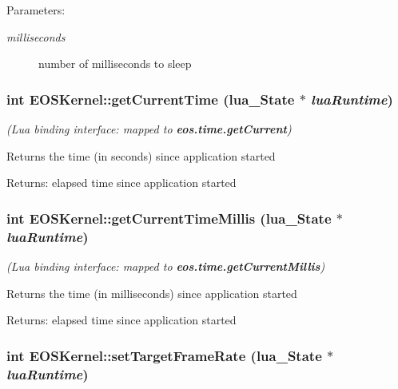 \begin{Desc}
\item[Parameters:]
\begin{description}
\item[{\em milliseconds}]number of milliseconds to sleep \end{description}
\end{Desc}
\hypertarget{structEOSKernel_8b244f5fbf545937dccaa2cb01720f33}{
\subsubsection[{getCurrentTime}]{\setlength{\rightskip}{0pt plus 5cm}int EOSKernel::getCurrentTime (lua\_\-State $\ast$ {\em luaRuntime})}}
\label{structEOSKernel_8b244f5fbf545937dccaa2cb01720f33}


{\em (Lua binding interface: mapped to {\bf eos.time.getCurrent})\/}\par
\par
 Returns the time (in seconds) since application started 

\begin{Desc}
\item[Returns:]elapsed time since application started \end{Desc}
\hypertarget{structEOSKernel_3b68f7decae2685ffa3137f290656a1e}{
\subsubsection[{getCurrentTimeMillis}]{\setlength{\rightskip}{0pt plus 5cm}int EOSKernel::getCurrentTimeMillis (lua\_\-State $\ast$ {\em luaRuntime})}}
\label{structEOSKernel_3b68f7decae2685ffa3137f290656a1e}


{\em (Lua binding interface: mapped to {\bf eos.time.getCurrentMillis})\/}\par
\par
 Returns the time (in milliseconds) since application started 

\begin{Desc}
\item[Returns:]elapsed time since application started \end{Desc}
\hypertarget{structEOSKernel_66a2b6a361992f0fb4c6e51c345e4811}{
\subsubsection[{setTargetFrameRate}]{\setlength{\rightskip}{0pt plus 5cm}int EOSKernel::setTargetFrameRate (lua\_\-State $\ast$ {\em luaRuntime})}}
\label{structEOSKernel_66a2b6a361992f0fb4c6e51c345e4811}



